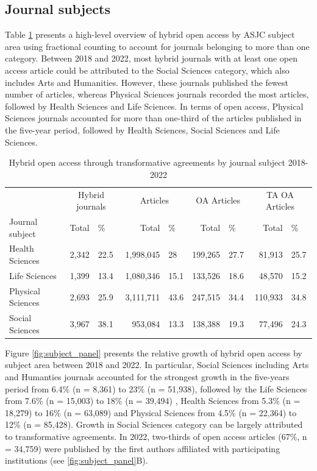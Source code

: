 \documentclass[a4paper,man,floatsintext,longtable,noextraspace,12pt]{apa6}
\begin{document}
\subsection{Journal subjects}\label{journal-subjects}

Table \ref{tab:subject_summary_table} presents a high-level overview of
hybrid open access by ASJC subject area using fractional counting to
account for journals belonging to more than one category. Between 2018
and 2022, most hybrid journals with at least one open access article
could be attributed to the Social Sciences category, which also includes
Arts and Humanities. However, these journals published the fewest number
of articles, whereas Physical Sciences journals recorded the most
articles, followed by Health Sciences and Life Sciences. In terms of
open access, Physical Sciences journals accounted for more than
one-third of the articles published in the five-year period, followed by
Health Sciences, Social Sciences and Life Sciences.

\begin{table}[H]

\caption{\label{tab:subject_summary_table}Hybrid open access through transformative agreements by journal subject 2018-2022}
\centering
\begin{tabular}[t]{lrlrlrlrl}
\toprule
\multicolumn{1}{c}{ } & \multicolumn{2}{c}{Hybrid journals} & \multicolumn{2}{c}{Articles} & \multicolumn{2}{c}{OA Articles} & \multicolumn{2}{c}{TA OA Articles} \\
\cmidrule(l{3pt}r{3pt}){2-3} \cmidrule(l{3pt}r{3pt}){4-5} \cmidrule(l{3pt}r{3pt}){6-7} \cmidrule(l{3pt}r{3pt}){8-9}
Journal subject & Total & \% & Total & \% & Total & \% & Total & \%\\
\midrule
Health Sciences & 2,342 & 22.5 & 1,998,045 & 28 & 199,265 & 27.7 & 81,913 & 25.7\\
Life Sciences & 1,399 & 13.4 & 1,080,346 & 15.1 & 133,526 & 18.6 & 48,570 & 15.2\\
Physical Sciences & 2,693 & 25.9 & 3,111,711 & 43.6 & 247,515 & 34.4 & 110,933 & 34.8\\
Social Sciences & 3,967 & 38.1 & 953,084 & 13.3 & 138,388 & 19.3 & 77,496 & 24.3\\
\bottomrule
\end{tabular}
\end{table}

Figure \ref{fig:subject_panel} presents the relative growth of hybrid
open access by subject area between 2018 and 2022. In particular, Social
Sciences including Arts and Humanties journals accounted for the
strongest growth in the five-years period from 6.4\% (n = 8,361) to 23\%
(n = 51,938), followed by the Life Sciences from 7.6\% (n = 15,003) to
18\% (n = 39,494) , Health Sciences from 5.3\% (n = 18,279) to 16\% (n =
63,089) and Physical Sciences from 4.5\% (n = 22,364) to 12\% (n =
85,428). Growth in Social Sciences category can be largely attributed to
transformative agreements. In 2022, two-thirds of open access articles
(67\%, n = 34,759) were published by the first authors affiliated with
participating institutions (see \ref{fig:subject_panel}B).
\end{document}
